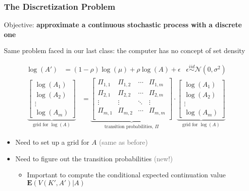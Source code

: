 \documentclass[10pt, aspectratio=1610, handout]{beamer}
\newcommand{\dimmer}[1]{\textcolor{dimgray}{#1}}
\newcommand{\E}{\mathbf{E}}
\begin{document}
  \begin{frame}
    \frametitle{The Discretization Problem}

    Objective: \textbf{approximate a continuous stochastic process with a discrete one}

    \vfill\pause

    Same problem faced in our last class: the computer has no concept of set density

    \vfill\pause

    \begin{align*}
      \log(A') &= (1 - \rho) \log(\mu) + \rho \log(A) + \epsilon & \epsilon \overset{iid}{\sim} \mathcal{N}(0, \sigma^2)
    \end{align*}
    \begin{align*}
      \underbrace{\begin{bmatrix}
        \log(A_1) \\ \log(A_2) \\ \vdots \\ \log(A_m)
      \end{bmatrix}}_{\text{grid for $\log(A)$}}
      &=
      \underbrace{\begin{bmatrix}
        \Pi_{1,1} & \Pi_{1,2} & \cdots & \Pi_{1,m} \\
        \Pi_{2,1} & \Pi_{2,2} & \cdots & \Pi_{2,m} \\
        \vdots    & \vdots    & \ddots & \vdots    \\
        \Pi_{m,1} & \Pi_{m,2} & \cdots & \Pi_{m,m} \\
      \end{bmatrix}}_{\text{transition probabilities, $\Pi$}}
      \cdot
      \underbrace{\begin{bmatrix}
        \log(A_1) \\ \log(A_2) \\ \vdots \\ \log(A_m)
      \end{bmatrix}}_{\text{grid for $\log(A)$}}
    \end{align*}

    \vfill\pause

    \begin{itemize}
      \item Need to set up a grid for $A$ \dimmer{(same as before)}
      \item Need to figure out the transition probabilities \dimmer{(new!)}
        \begin{itemize}
          \item Important to compute the conditional expected continuation value $\E \left( V(K', A') | A \right)$
        \end{itemize}
    \end{itemize}

  \end{frame}
\end{document}
